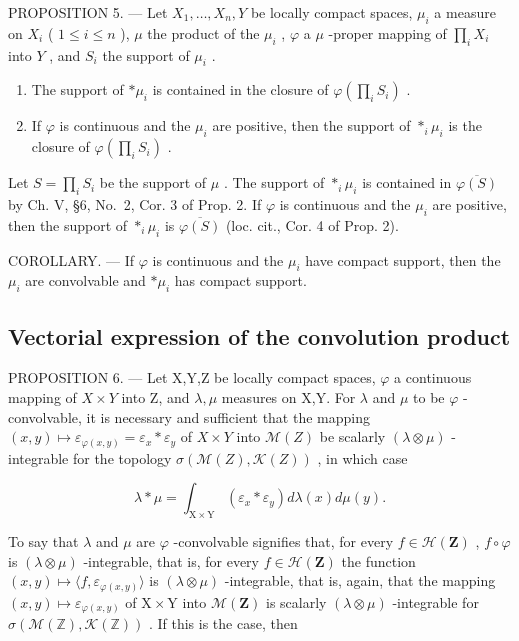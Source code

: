 PROPOSITION 5. --- Let \(X_1, \ldots, X_n, Y\) be locally compact spaces, \(\mu_i\) a measure on \(X_i\) ( \(1 \leqslant i \leqslant n\) ), \(\mu\) the product of the \(\mu_i\) , \(\varphi\) a \(\mu\) -proper mapping of \(\prod_i X_i\) into \(Y\) , and \(S_i\) the support of \(\mu_i\) .

\begin{enumerate}
\def\labelenumi{\alph{enumi})}
\item
  The support of \(*\mu_i\) is contained in the closure of \(\varphi\left(\prod_{i}S_i\right)\) .
\item
  If \(\varphi\) is continuous and the \(\mu_{i}\) are positive, then the support of \(*_{i} \mu_{i}\) is the closure of \(\varphi\left(\prod_{i} S_{i}\right)\) .
\end{enumerate}

Let \(S = \prod_{i} S_{i}\) be the support of \(\mu\) . The support of \(*_{i} \mu_{i}\) is contained in \(\overline{\varphi(S)}\) by Ch. V, §6, No.~2, Cor. 3 of Prop. 2. If \(\varphi\) is continuous and the \(\mu_{i}\) are positive, then the support of \(*_{i} \mu_{i}\) is \(\overline{\varphi(S)}\) (loc. cit., Cor. 4 of Prop. 2).

COROLLARY. --- If \(\varphi\) is continuous and the \(\mu_{i}\) have compact support, then the \(\mu_{i}\) are convolvable and \(*\mu_{i}\) has compact support.

\subsection{Vectorial expression of the convolution product}

PROPOSITION 6. --- Let X,Y,Z be locally compact spaces, \(\varphi\) a continuous mapping of \(X \times Y\) into Z, and \(\lambda, \mu\) measures on X,Y. For \(\lambda\) and \(\mu\) to be \(\varphi\) -convolvable, it is necessary and sufficient that the mapping \((x,y) \mapsto \varepsilon_{\varphi(x,y)} = \varepsilon_x * \varepsilon_y\) of \(X \times Y\) into \(\mathcal{M}(Z)\) be scalarly \((\lambda \otimes \mu)\) -integrable for the topology \(\sigma(\mathcal{M}(Z), \mathcal{K}(Z))\) , in which case

\[
\lambda * \mu = \int_ {\mathrm{X} \times \mathrm{Y}} \left(\varepsilon_ {x} * \varepsilon_ {y}\right) d \lambda (x) d \mu (y).
\]

To say that \(\lambda\) and \(\mu\) are \(\varphi\) -convolvable signifies that, for every \(f \in \mathcal{H}(\mathbf{Z})\) , \(f \circ \varphi\) is \((\lambda \otimes \mu)\) -integrable, that is, for every \(f \in \mathcal{H}(\mathbf{Z})\) the function \((x,y) \mapsto \langle f, \varepsilon_{\varphi(x,y)} \rangle\) is \((\lambda \otimes \mu)\) -integrable, that is, again, that the mapping \((x,y) \mapsto \varepsilon_{\varphi(x,y)}\) of \(\mathrm{X} \times \mathrm{Y}\) into \(\mathcal{M}(\mathbf{Z})\) is scalarly \((\lambda \otimes \mu)\) -integrable for \(\sigma (\mathcal{M}(\mathbb{Z}),\mathcal{K}(\mathbb{Z}))\) . If this is the case, then

